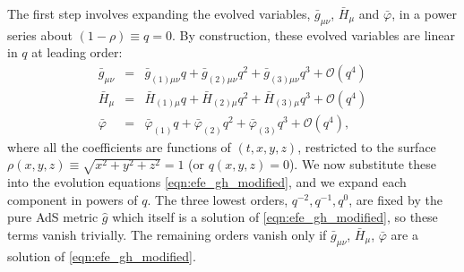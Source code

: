 \documentclass[a4paper,11pt]{article}
\numberwithin{equation}{section}
\begin{document}
The first step involves expanding the evolved variables, $\bar{g}_{\mu \nu}$, $\bar{H}_{\mu}$ and $\bar{\varphi}$, in a power series about $(1-\rho) \equiv q = 0$. 
By construction, these evolved variables are linear in $q$ at leading order:
\begin{eqnarray}\label{eqn:qexp}
\bar{g}_{\mu \nu} &=& \bar{g}_{(1) \mu \nu} q + \bar{g}_{(2) \mu \nu} q^2 + \bar{g}_{(3) \mu \nu} q^3 + \mathcal{O}(q^4) \label{eqn:qexpg} \\
\bar{H}_{\mu} &=& \bar{H}_{(1) \mu} q + \bar{H}_{(2) \mu} q^2 + \bar{H}_{(3) \mu} q^3 + \mathcal{O}(q^4)  \label{eqn:qexpH}\\
\bar{\varphi} &=& \bar{\varphi}_{(1)} q + \bar{\varphi}_{(2)} q^2 + \bar{\varphi}_{(3)} q^3 + \mathcal{O}(q^4), \label{eqn:qexpphi}
\end{eqnarray}
where all the coefficients are functions of $(t,x,y,z)$, restricted to the surface $\rho(x,y,z)\equiv\sqrt{x^2+y^2+z^2}=1$ (or $q(x,y,z)=0$). 
We now substitute these into the evolution equations \eqref{eqn:efe_gh_modified}, and we expand each component in powers of $q$. The three lowest orders, $q^{-2},q^{-1},q^0$, are fixed by the pure AdS metric $\hat{g}$ which itself is a solution of \eqref{eqn:efe_gh_modified}, so these terms vanish trivially. The remaining orders vanish only if $\bar{g}_{\mu \nu}$, $\bar{H}_{\mu}$, $\bar{\varphi}$ are a solution of \eqref{eqn:efe_gh_modified}.
\end{document}
